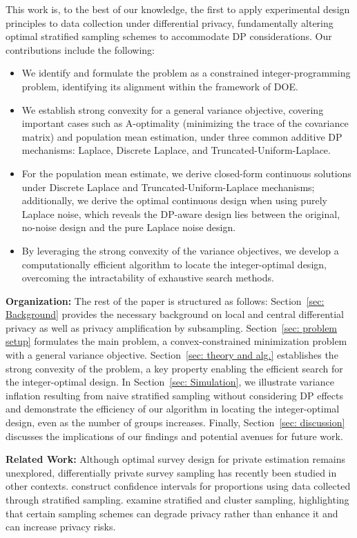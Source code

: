 \documentclass{article}
\theoremstyle{definition}
\begin{document}
This work is, to the best of our knowledge, the first to apply experimental design principles to data collection under differential privacy, fundamentally altering optimal stratified sampling schemes to accommodate DP considerations. Our contributions include the following:
\begin{itemize}
    \item  We identify and formulate the problem as a constrained integer-programming problem, identifying its alignment within the framework of DOE.
    \item  We establish strong convexity for a general variance objective, covering important cases such as A-optimality (minimizing the trace of the covariance matrix) and population mean estimation, under three common additive DP mechanisms: Laplace, Discrete Laplace, and Truncated-Uniform-Laplace.
    \item  For the population mean estimate, we derive closed-form continuous solutions under Discrete Laplace and Truncated-Uniform-Laplace mechanisms; additionally, we derive the optimal continuous design when using purely Laplace noise, which reveals the DP-aware design lies between the original, no-noise design and the pure Laplace noise design.
    \item  By leveraging the strong convexity of the variance objectives, we develop a computationally efficient algorithm to locate the integer-optimal design, overcoming the intractability of exhaustive search methods.
\end{itemize}

\textbf{Organization:} The rest of the paper is structured as follows: Section~\ref{sec: Background} provides the necessary background on local and central differential privacy as well as privacy amplification by subsampling. Section~\ref{sec: problem setup} formulates the main problem, a convex-constrained minimization problem with a general variance objective. Section~\ref{sec: theory and alg.} establishes the strong convexity of the problem, a key property enabling the efficient search for the integer-optimal design. In Section~\ref{sec: Simulation}, we illustrate variance inflation resulting from naive stratified sampling without considering DP effects and demonstrate the efficiency of our algorithm in locating the integer-optimal design, even as the number of groups increases. Finally, Section~\ref{sec: discussion} discusses the implications of our findings and potential avenues for future work.

\textbf{Related Work:} Although optimal survey design for private estimation remains unexplored, differentially private survey sampling has recently been studied in other contexts. \citet{lin2024differentially} construct confidence intervals for proportions using data collected through stratified sampling. \citet{bun2020controlling} examine stratified and cluster sampling, highlighting that certain sampling schemes can degrade privacy rather than enhance it and can increase privacy risks.
\end{document}

